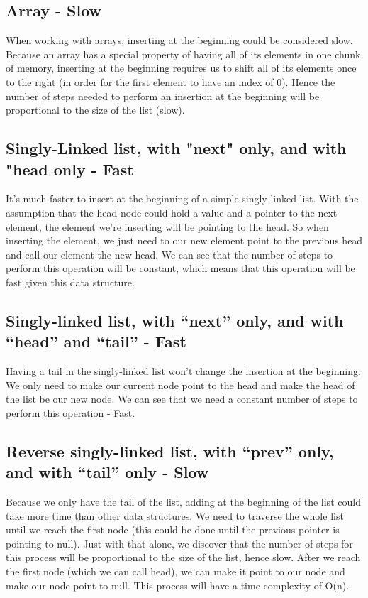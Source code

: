 \documentclass{article}
\begin{document}
\subsection{Array - Slow}
When working with arrays, inserting at the beginning could be considered slow. Because an array has a special property of having all of its elements in one chunk of memory, inserting at the beginning requires us to shift all of its elements once to the right (in order for the first element to have an index of 0). Hence the number of steps needed to perform an insertion at the beginning will be proportional to the size of the list (slow).

\subsection{Singly-Linked list, with "next" only, and with "head only - Fast}
It's much faster to insert at the beginning of a simple singly-linked list. With the assumption that the head node could hold a value and a pointer to the next element, the element we're inserting will be pointing to the head. So when inserting the element, we just need to our new element point to the previous head and call our element the new head. We can see that the number of steps to perform this operation will be constant, which means that this operation will be fast given this data structure. 

\subsection{Singly-linked list, with “next” only, and with “head” and “tail” - Fast}
Having a tail in the singly-linked list won't change the insertion at the beginning. We only need to make our current node point to the head and make the head of the list be our new node. We can see that we need a constant number of steps to perform this operation - Fast.

\subsection{Reverse singly-linked list, with “prev” only, and with “tail” only - Slow}
Because we only have the tail of the list, adding at the beginning of the list could take more time than other data structures. We need to traverse the whole list until we reach the first node (this could be done until the previous pointer is pointing to null). Just with that alone, we discover that the number of steps for this process will be proportional to the size of the list, hence slow. After we reach the first node (which we can call head), we can make it point to our node and make our node point to null. This process will have a time complexity of O(n).  
\end{document}
